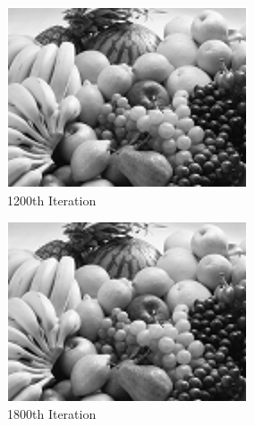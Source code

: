 \documentclass{paper}
\begin{document}
\begin{enumerate}
\begin{figure}[h]
\begin{center}
\begin{subfigure}[b]{0.49\textwidth}
                \includegraphics[width=\textwidth]{it1200}
                \caption{1200th Iteration}
        \end{subfigure}
        \begin{subfigure}[b]{0.49\textwidth}
                \includegraphics[width=\textwidth]{it1800}
                \caption{1800th Iteration}
        \end{subfigure}
        \begin{subfigure}[b]{0.49\textwidth}

\end{subfigure}
\end{center}
\end{figure}
\end{enumerate}
\end{document}
